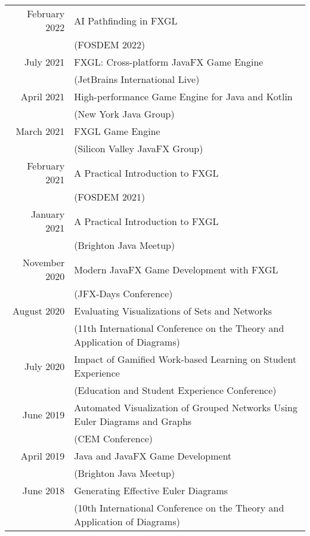 \documentclass[a4paper,11pt]{article} %
\begin{document}
\begin{center}
\begin{tabular}{rl}

February 2022 & AI Pathfinding in FXGL\\ & (FOSDEM 2022) \\

July 2021 & FXGL: Cross-platform JavaFX Game Engine\\ & (JetBrains International Live) \\

April 2021 & High-performance Game Engine for Java and Kotlin \\ & (New York Java Group) \\

March 2021 & FXGL Game Engine\\ & (Silicon Valley JavaFX Group) \\

February 2021 & A Practical Introduction to FXGL\\ & (FOSDEM 2021) \\

January 2021 & A Practical Introduction to FXGL\\ & (Brighton Java Meetup) \\

November 2020 & Modern JavaFX Game Development with FXGL\\ & (JFX-Days Conference) \\

August 2020 & Evaluating Visualizations of Sets and Networks\\ & (11th International Conference on the Theory and Application of Diagrams) \\

July 2020 & Impact of Gamified Work-based Learning on Student Experience\\ & (Education and Student Experience Conference)\\

June 2019 & Automated Visualization of Grouped Networks Using Euler Diagrams and Graphs\\ & (CEM Conference) \\

April 2019 & Java and JavaFX Game Development\\ & (Brighton Java Meetup) \\

June 2018 & Generating Effective Euler Diagrams\\ & (10th International Conference on the Theory and Application of Diagrams) \\





\end{tabular}
\end{center}
\end{document}
